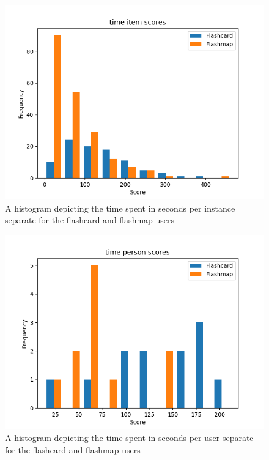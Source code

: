 \begin{figure}
    \centering
    \includegraphics[width=.7\textwidth]{img/time_diff.png}
    \caption{A histogram depicting the time spent in seconds per instance separate for the flashcard and flashmap users}
    \label{fig:time_diff}
\end{figure}
\begin{figure}
    \centering
    \includegraphics[width=.7\textwidth]{img/time_abil.png}
    \caption{A histogram depicting the time spent in seconds per user separate for the flashcard and flashmap users}
    \label{fig:time_abil}
\end{figure}

